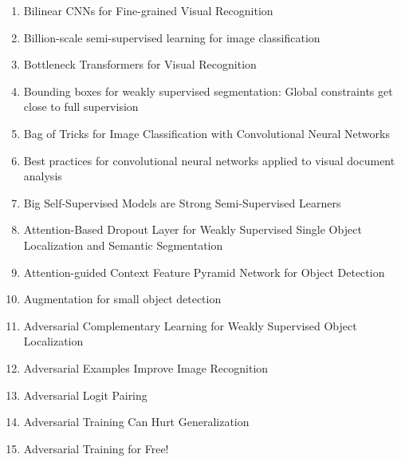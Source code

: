 \documentclass[acmlarge]{acmart}
\begin{document}
\begin{enumerate}
	\item Bilinear CNNs for Fine-grained Visual Recognition \cite{Lin2015BilinearCF} 

	\item Billion-scale semi-supervised learning for image classification \cite{Yalniz2019BillionscaleSL} 

	\item Bottleneck Transformers for Visual Recognition \cite{Srinivas2021BottleneckTF} 

	\item Bounding boxes for weakly supervised segmentation: Global constraints get close to full supervision \cite{Kervadec2020BoundingBF} 

	\item Bag of Tricks for Image Classification with Convolutional Neural Networks \cite{He2019BagOT} 

	\item Best practices for convolutional neural networks applied to visual document analysis \cite{Simard2003BestPF} 

	\item Big Self-Supervised Models are Strong Semi-Supervised Learners \cite{Chen2020BigSM} 

	\item Attention-Based Dropout Layer for Weakly Supervised Single Object Localization and Semantic Segmentation \cite{Choe2021AttentionBasedDL} 

	\item Attention-guided Context Feature Pyramid Network for Object Detection \cite{Cao2020AttentionguidedCF} 

	\item Augmentation for small object detection \cite{Kisantal2019AugmentationFS} 

	\item Adversarial Complementary Learning for Weakly Supervised Object Localization \cite{Zhang2018AdversarialCL} 

	\item Adversarial Examples Improve Image Recognition \cite{Xie2020AdversarialEI} 

	\item Adversarial Logit Pairing \cite{Kannan2018AdversarialLP} 

	\item Adversarial Training Can Hurt Generalization \cite{Raghunathan2019AdversarialTC} 

	\item Adversarial Training for Free! \cite{Shafahi2019AdversarialTF} 


\end{enumerate}
\end{document}
